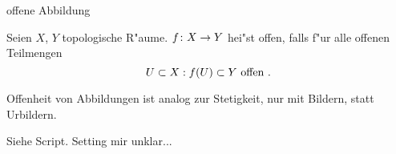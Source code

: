 \documentclass[class=article, crop=false]{standalone}
\begin{document}
\begin{zettel}{offene Abbildung}
\begin{flashcard}[]{}
	\begin{definition}
		Seien $X$, $Y$ topologische R"aume. $f \colon X\to Y$ hei"st offen, falls f"ur alle offenen Teilmengen
		\[
			U \subset X : f(U) \subset  Y \text{ offen }
		.\]
	\end{definition}
\end{flashcard}
\begin{remark}
	Offenheit von Abbildungen ist analog zur Stetigkeit, nur mit Bildern, statt Urbildern.
\end{remark}
\begin{corollary}
	Siehe Script. Setting mir unklar...
\end{corollary}
\end{zettel}
\end{document}
